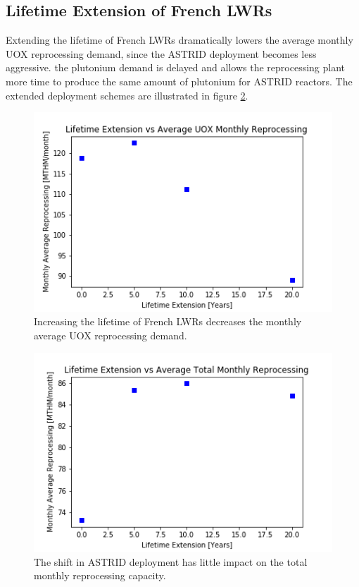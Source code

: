 \subsection{Lifetime Extension of French \glspl{LWR}}
Extending the lifetime of French \glspl{LWR} dramatically lowers the average
monthly \gls{UOX} reprocessing demand, since the \gls{ASTRID} deployment becomes less
aggressive. the plutonium demand is delayed and allows the reprocessing plant more
time to produce the same amount of plutonium for \gls{ASTRID} reactors. The
extended deployment schemes are illustrated in figure \ref{fig:ext}. 

\begin{figure}[htbp!]
    \begin{center}
        \includegraphics[scale=0.6]{./images/sensitivity/ext_uox.png}
    \end{center}
    \caption{Increasing the lifetime of French \glspl{LWR} decreases the monthly
             average \gls{UOX} reprocessing demand.}
    \label{fig:ext}
\end{figure}


\begin{figure}[htbp!]
    \begin{center}
        \includegraphics[scale=0.6]{./images/sensitivity/ext_all.png}
    \end{center}
    \caption{The shift in \gls{ASTRID} deployment has little impact on the total monthly
             reprocessing capacity.}
    \label{fig:ext}
\end{figure}



